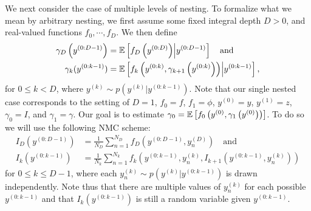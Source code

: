 We next consider the case of multiple levels of nesting.
To formalize what we mean by arbitrary nesting, we first assume some fixed integral depth
$D > 0$, and real-valued functions $f_0, \cdots, f_D$.
We then define
\begin{align*}
  \gamma_D\left(y^{(0:D-1)}\right) &= \mathbb{E} \left[f_D\left(y^{(0:D)}\right) \middle| y^{(0:D-1)}\right] \quad \text{and} \\
  \gamma_k(y^{(0:k-1)}) &= \mathbb{E} \left[f_k\left(y^{(0:k)}, \gamma_{k+1}\left(y^{(0:k)}\right)\right) \middle| y^{(0:k-1)}\right],
\end{align*}
for $0 \leq k < D$, where $y^{(k)} \sim p\left(y^{(k)}|y^{(0:k-1)}\right)$. 
Note that our single nested case corresponds to the setting of $D=1$, $f_0 = f$, $f_1 = \phi$, $y^{(0)}=y$,
$y^{(1)}=z$, $\gamma_0 = I$, and $\gamma_1 = \gamma$. Our goal is to
estimate $\gamma_0 = \mathbb{E} \left[f_0\left(y^{(0)},
\gamma_1\left(y^{(0)}\right)\right)\right]$. To do so we will use the following NMC scheme:
\begin{align*}
  I_D\left(y^{(0:D-1)}\right) &= \frac{1}{N_D} \sum_{n=1}^{N_D} f_D\left(y^{(0:D-1)}, y^{(D)}_n\right) \quad \text{and} \\
  I_k\left(y^{(0:k-1)}\right) &= \frac{1}{N_k} \sum_{n=1}^{N_k} f_k\left(y^{(0:k-1)}, y^{(k)}_n, I_{k+1}\left(y^{(0:k-1)}, y^{(k)}_n\right)\right)
\end{align*}
for $0 \leq k \le D-1$, where each $y^{(k)}_n \sim p\left(y^{(k)}|y^{(0:k-1)}\right)$ is drawn
independently. Note thus that there are multiple values of $y^{(k)}_n$ for each possible $y^{(0:k-1)}$
and that $I_k\left(y^{(0:k-1)}\right)$ is still a random variable given  $y^{(0:k-1)}$.

